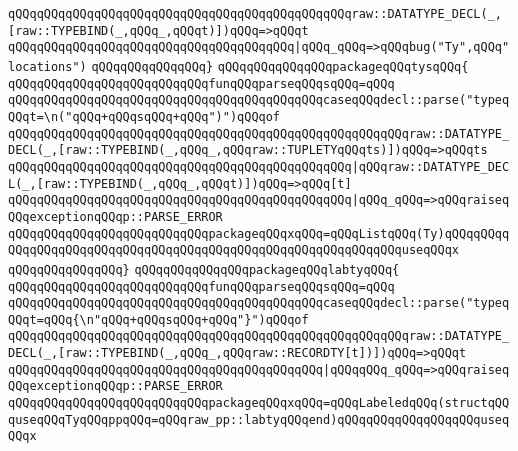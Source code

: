 \verb|qQQqqQQqqQQqqQQqqQQqqQQqqQQqqQQqqQQqqQQqqQQqqQQqraw::DATATYPE_DECL(_,[raw::TYPEBIND(_,qQQq_,qQQqt)])qQQq=>qQQqt|\newline
\verb|qQQqqQQqqQQqqQQqqQQqqQQqqQQqqQQqqQQqqQQq|\verb#|qQQq_qQQq=>qQQqbug("Ty",qQQq"locations")#\newline
\verb|qQQqqQQqqQQqqQQq}|\newline
\newline
\verb|qQQqqQQqqQQqqQQqpackageqQQqtysqQQq{|\newline
\newline
\verb|qQQqqQQqqQQqqQQqqQQqqQQqqQQqfunqQQqparseqQQqsqQQq=qQQq|\newline
\verb|qQQqqQQqqQQqqQQqqQQqqQQqqQQqqQQqqQQqqQQqqQQqcaseqQQqdecl::parse("typeqQQqt=\n("qQQq+qQQqsqQQq+qQQq")")qQQqof|\newline
\verb|qQQqqQQqqQQqqQQqqQQqqQQqqQQqqQQqqQQqqQQqqQQqqQQqqQQqqQQqraw::DATATYPE_DECL(_,[raw::TYPEBIND(_,qQQq_,qQQqraw::TUPLETYqQQqts)])qQQq=>qQQqts|\newline
\verb|qQQqqQQqqQQqqQQqqQQqqQQqqQQqqQQqqQQqqQQqqQQqqQQq|\verb#|qQQqraw::DATATYPE_DECL(_,[raw::TYPEBIND(_,qQQq_,qQQqt)])qQQq=>qQQq[t]#\newline
\verb|qQQqqQQqqQQqqQQqqQQqqQQqqQQqqQQqqQQqqQQqqQQqqQQq|\verb#|qQQq_qQQq=>qQQqraiseqQQqexceptionqQQqp::PARSE_ERROR#\newline
\verb|qQQqqQQqqQQqqQQqqQQqqQQqqQQqpackageqQQqxqQQq=qQQqListqQQq(Ty)qQQqqQQqqQQqqQQqqQQqqQQqqQQqqQQqqQQqqQQqqQQqqQQqqQQqqQQqqQQqqQQquseqQQqx|\newline
\verb|qQQqqQQqqQQqqQQq}|\newline
\newline
\verb|qQQqqQQqqQQqqQQqpackageqQQqlabtyqQQq{|\newline
\newline
\verb|qQQqqQQqqQQqqQQqqQQqqQQqqQQqfunqQQqparseqQQqsqQQq=qQQq|\newline
\verb|qQQqqQQqqQQqqQQqqQQqqQQqqQQqqQQqqQQqqQQqqQQqcaseqQQqdecl::parse("typeqQQqt=qQQq{\n"qQQq+qQQqsqQQq+qQQq"}")qQQqof|\newline
\verb|qQQqqQQqqQQqqQQqqQQqqQQqqQQqqQQqqQQqqQQqqQQqqQQqqQQqqQQqraw::DATATYPE_DECL(_,[raw::TYPEBIND(_,qQQq_,qQQqraw::RECORDTY[t])])qQQq=>qQQqt|\newline
\verb|qQQqqQQqqQQqqQQqqQQqqQQqqQQqqQQqqQQqqQQqqQQq|\verb#|qQQqqQQq_qQQq=>qQQqraiseqQQqexceptionqQQqp::PARSE_ERROR#\newline
\verb|qQQqqQQqqQQqqQQqqQQqqQQqqQQqpackageqQQqxqQQq=qQQqLabeledqQQq(structqQQquseqQQqTyqQQqppqQQq=qQQqraw_pp::labtyqQQqend)qQQqqQQqqQQqqQQqqQQquseqQQqx|\newline
